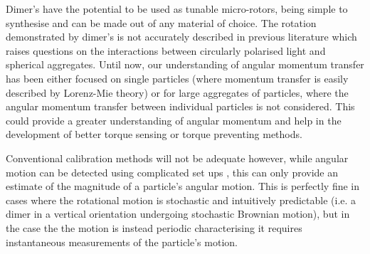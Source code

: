 Dimer's have the potential to be used as tunable micro-rotors, being 
simple to synthesise and can be made out of any material of choice.
The rotation demonstrated by dimer's is not accurately described in
previous literature which raises questions on the interactions between
circularly polarised light and spherical aggregates. Until now, our 
understanding of angular momentum transfer has been either focused on 
single particles (where momentum transfer is easily described by 
Lorenz-Mie theory) or for large aggregates of particles, where the 
angular momentum transfer between individual particles is not considered. 
This could provide a greater understanding of angular momentum and help in 
the development of better torque sensing or torque preventing methods.

Conventional calibration methods will not be adequate however, while
angular motion can be detected using complicated set ups \cite{Bang2020},
this can only provide an estimate of the magnitude of a particle's 
angular motion. This is perfectly fine in cases where the rotational
motion is stochastic and intuitively predictable (i.e. a dimer in a
vertical orientation undergoing stochastic Brownian motion), but in 
the case the the motion is instead periodic characterising it requires
instantaneous measurements of the particle's motion. 
